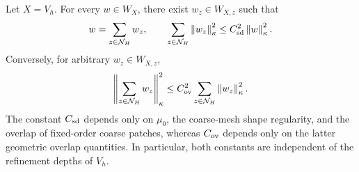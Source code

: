 \begin{theorem}
\label{thm:stable-decomposition}
Let $X=V_h$. For every $w\in W_X$, there exist
$w_z\in W_{X,z}$ such that
\begin{equation}
\label{eq:stable-decomposition}
  w
  =
  \sum_{z\in\mathcal N_H}w_z,
  \qquad
  \sum_{z\in\mathcal N_H}
  \left\lVert w_z\right\rVert_\kappa^2
  \leq
  C_{\rm sd}^2\left\lVert w\right\rVert_\kappa^2.
\end{equation}
Conversely, for arbitrary $w_z\in W_{X,z}$,
\begin{equation}
\label{eq:stable-synthesis}
  \left\lVert 
    \sum_{z\in\mathcal N_H}w_z
  \right\rVert_\kappa^2
  \leq
  C_{\rm ov}^2
  \sum_{z\in\mathcal N_H}\left\lVert w_z\right\rVert_\kappa^2.
\end{equation}
The constant $C_{\rm sd}$ depends only on $\mu_0$, the coarse-mesh
shape regularity, and the overlap of fixed-order coarse patches, whereas
$C_{\rm ov}$ depends only on the latter geometric overlap quantities.
In particular, both constants are independent of the refinement depths
of $V_h$.
\end{theorem}

